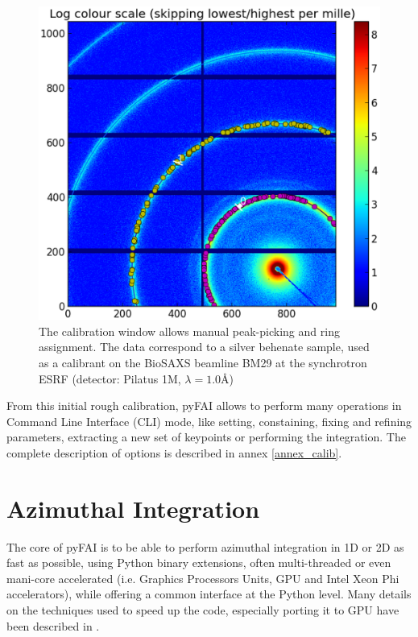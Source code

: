\documentclass[preprint]{iucr}
\begin{document}
\begin{figure}
\label{calib}
\begin{center}
\includegraphics[width=15cm]{calib.eps}
\caption{The calibration window allows manual peak-picking and
ring assignment. The data correspond to a silver behenate sample, used as a
calibrant on the BioSAXS beamline BM29 at the synchrotron ESRF
(detector: Pilatus 1M, $\lambda=1.0${\AA})}
\end{center}
\end{figure}

From this initial rough calibration, pyFAI allows to perform many operations in
Command Line Interface (CLI) mode, like setting, constaining, fixing and
refining parameters, extracting a new set of keypoints or performing the
integration. The complete description of options is described in annex
\ref{annex_calib}.

\section{Azimuthal Integration}

The core of pyFAI is to be able to perform azimuthal integration in 1D or 2D as
fast as possible, using Python binary extensions, often multi-threaded or even
mani-core accelerated (i.e. Graphics Processors Units, GPU and Intel Xeon
Phi accelerators), while offering a common interface at the Python level.
Many details on the techniques used to speed up the code, especially porting
it to GPU have been described in \cite{kieffer_ashiotis-proc-euroscipy-2014}.
\end{document}
